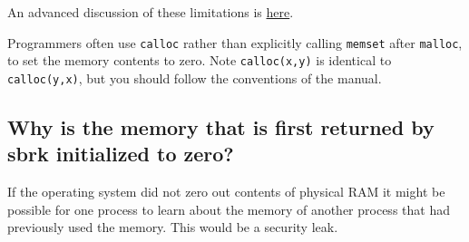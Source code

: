 \begin{Shaded}
\begin{Highlighting}[]
 
\NormalTok{\{}
     
    
      
    

     
\NormalTok{\}}
\end{Highlighting}
\end{Shaded}

An advanced discussion of these limitations is
\href{http://locklessinc.com/articles/calloc/}{here}.

Programmers often use \texttt{calloc} rather than explicitly calling
\texttt{memset} after \texttt{malloc}, to set the memory contents to
zero. Note \texttt{calloc(x,y)} is identical to \texttt{calloc(y,x)},
but you should follow the conventions of the manual.

\begin{Shaded}
\begin{Highlighting}[]
\NormalTok{);}
\NormalTok{, }\NormalTok{); }

\NormalTok{, }\NormalTok{); }
\end{Highlighting}
\end{Shaded}

\subsection{Why is the memory that is first returned by sbrk initialized
to
zero?}\label{why-is-the-memory-that-is-first-returned-by-sbrk-initialized-to-zero}

If the operating system did not zero out contents of physical RAM it
might be possible for one process to learn about the memory of another
process that had previously used the memory. This would be a security
leak.

